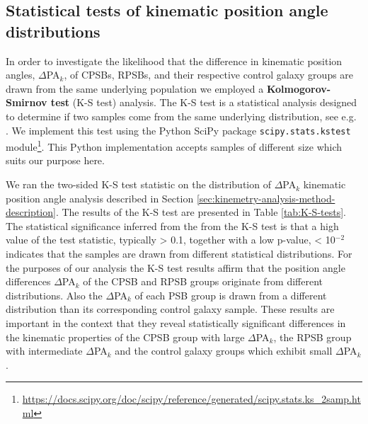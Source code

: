 \subsection{Statistical tests of kinematic position angle distributions}
\label{sec:K-S-test}
In order to investigate the likelihood that the difference in kinematic position angles, $\Delta$PA$_{k}$, of CPSBs, RPSBs, and their respective control galaxy groups are drawn from the same underlying population we employed a \textbf{Kolmogorov-Smirnov test} (K-S test) analysis. The K-S test is a statistical analysis designed to determine if two samples come from the same underlying distribution, see e.g. \citet{hodges1958significance}. We implement this test using the Python SciPy package \texttt{scipy.stats.kstest} module\footnote{\href{https://docs.scipy.org/doc/scipy/reference/generated/scipy.stats.ks\_2samp.html}{https://docs.scipy.org/doc/scipy/reference/generated/scipy.stats.ks\_2samp.html}}. This Python implementation accepts samples of different size which suits our purpose here.

We ran the two-sided K-S test statistic on the distribution of $\Delta$PA$_{k}$ kinematic position angle analysis described in Section \ref{sec:kinemetry-analysis-method-description}. The results of the K-S test are presented in Table \ref{tab:K-S-tests}. The statistical significance inferred from the from the K-S test is that a high value of the test statistic, typically > 0.1, together with a low p-value, < 10$^{-2}$ indicates that the samples are drawn from different statistical distributions. For the purposes of our analysis the K-S test results affirm that the position angle differences $\Delta$PA$_{k}$ of the CPSB and RPSB groups originate from different distributions. Also the $\Delta$PA$_{k}$ of each PSB group is drawn from a different distribution than its corresponding control galaxy sample. These results are important in the context that they reveal statistically significant differences in the kinematic properties of the CPSB group with large $\Delta$PA$_{k}$, the RPSB group with intermediate $\Delta$PA$_{k}$ and the control galaxy groups which exhibit small $\Delta$PA$_{k}$. 

